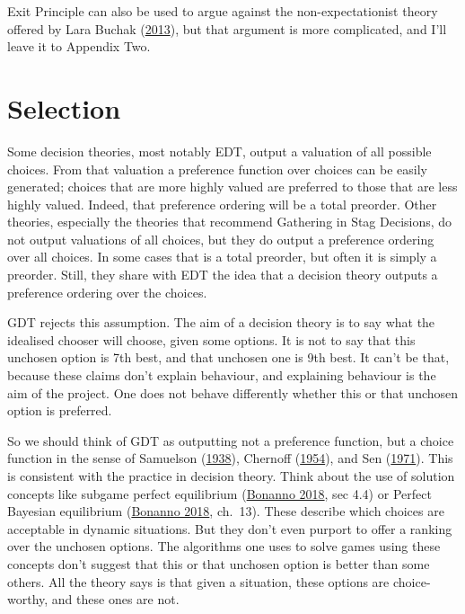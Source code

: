 \documentclass[
  12pt,
  letterpaper,
  DIV=11,
  numbers=noendperiod]{scrreprt}
\begin{document}
Exit Principle can also be used to argue against the non-expectationist
theory offered by Lara Buchak
(\protect\hyperlink{ref-BuchakRisk}{2013}), but that argument is more
complicated, and I'll leave it to Appendix Two.


\hypertarget{sec-select}{%
\chapter{Selection}\label{sec-select}}

Some decision theories, most notably EDT, output a valuation of all
possible choices. From that valuation a preference function over choices
can be easily generated; choices that are more highly valued are
preferred to those that are less highly valued. Indeed, that preference
ordering will be a total preorder. Other theories, especially the
theories that recommend Gathering in Stag Decisions, do not output
valuations of all choices, but they do output a preference ordering over
all choices. In some cases that is a total preorder, but often it is
simply a preorder. Still, they share with EDT the idea that a decision
theory outputs a preference ordering over the choices.

GDT rejects this assumption. The aim of a decision theory is to say what
the idealised chooser will choose, given some options. It is not to say
that this unchosen option is 7th best, and that unchosen one is 9th
best. It can't be that, because these claims don't explain behaviour,
and explaining behaviour is the aim of the project. One does not behave
differently whether this or that unchosen option is preferred.

So we should think of GDT as outputting not a preference function, but a
choice function in the sense of Samuelson
(\protect\hyperlink{ref-Samuelson1938}{1938}), Chernoff
(\protect\hyperlink{ref-Chernoff1954}{1954}), and Sen
(\protect\hyperlink{ref-Sen1971}{1971}). This is consistent with the
practice in decision theory. Think about the use of solution concepts
like subgame perfect equilibrium
(\protect\hyperlink{ref-Bonanno2018}{Bonanno 2018}, sec 4.4) or Perfect
Bayesian equilibrium (\protect\hyperlink{ref-Bonanno2018}{Bonanno 2018},
ch.~13). These describe which choices are acceptable in dynamic
situations. But they don't even purport to offer a ranking over the
unchosen options. The algorithms one uses to solve games using these
concepts don't suggest that this or that unchosen option is better than
some others. All the theory says is that given a situation, these
options are choice-worthy, and these ones are not.
\end{document}
